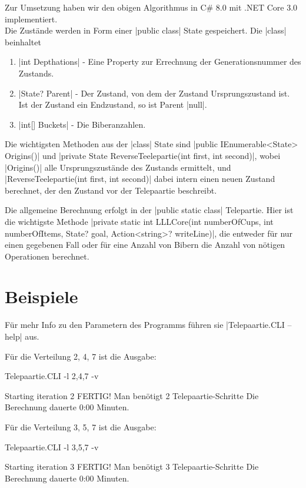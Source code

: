 \documentclass[a4paper,10pt,ngerman]{scrartcl}
\begin{document}
Zur Umsetzung haben wir den obigen Algorithmus in C\# 8.0 mit
.NET Core 3.0 implementiert.\\
Die Zustände werden in Form einer |public class| State gespeichert.
Die |class| beinhaltet

\begin{enumerate}
    \item |int Depthations| - 
        Eine Property zur Errechnung der Generationsnummer des Zustands.
    \item |State? Parent| - 
        Der Zustand, von dem der Zustand Ursprungszustand ist.
        Ist der Zustand ein Endzustand, so ist Parent |null|.
    \item |int[] Buckets| - Die Biberanzahlen.
\end{enumerate}

Die wichtigsten Methoden aus der |class| State sind |public IEnumerable<State> Origins()| und |private State ReverseTeelepartie(int first, int second)|, wobei |Origins()| alle Ursprungszustände des Zustands ermittelt, und |ReverseTeelepartie(int first, int second)| dabei intern einen neuen Zustand berechnet, der den Zustand vor der Telepaartie beschreibt. 

Die allgemeine Berechnung erfolgt in der |public static class| Telepartie. Hier ist die wichtigste Methode |private static int LLLCore(int numberOfCups, int numberOfItems, State? goal, Action<string>? writeLine)|, die entweder für nur einen gegebenen Fall oder für eine Anzahl von Bibern die Anzahl von nötigen Operationen berechnet.

\section{Beispiele}

Für mehr Info zu den Parametern des Programms führen sie |Telepaartie.CLI --help| aus.

Für die Verteilung 2, 4, 7 ist die Ausgabe:
\begin{lstcs}
Telepaartie.CLI -l 2,4,7 -v

Starting iteration 2
FERTIG!
Man benötigt 2 Telepaartie-Schritte
Die Berechnung dauerte 0:00 Minuten.
\end{lstcs}

Für die Verteilung 3, 5, 7 ist die Ausgabe:
\begin{lstcs}
Telepaartie.CLI -l 3,5,7 -v

Starting iteration 3
FERTIG!
Man benötigt 3 Telepaartie-Schritte
Die Berechnung dauerte 0:00 Minuten.
\end{lstcs}
\end{document}
